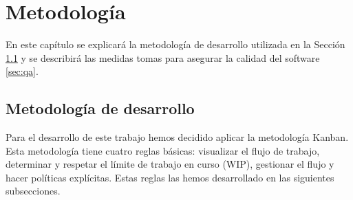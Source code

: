 \chapter{Metodología}\label{cap:metodologia}
En este capítulo se explicará la metodología de desarrollo utilizada en la Sección \ref{cap:Kanban} y se describirá las medidas tomas para asegurar la calidad del software \ref{sec:qa}.

\section{Metodología de desarrollo}\label{cap:Kanban}
Para el desarrollo de este trabajo hemos decidido aplicar la metodología Kanban. Esta metodología tiene cuatro reglas básicas: visualizar el flujo de trabajo, determinar y respetar el límite de trabajo en curso (WIP), gestionar el flujo y hacer políticas explícitas. Estas reglas las hemos desarrollado en las siguientes subsecciones.

